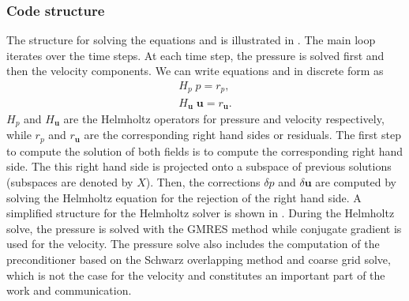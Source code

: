 \documentclass{sig-alternate}
\begin{document}
\subsubsection{Code structure}
\label{sec:code}

The structure for solving the equations  and  is illustrated in . The main loop iterates over the time steps. At each time step, the pressure is solved first and then the velocity components. We can write equations  and  in discrete form as 
\begin{align}
H_p \; p = r_p, \\
H_{\mathbf{u}} \; \mathbf{u} = r_{\mathbf{u}}.
\end{align}
$H_p$ and $H_{\mathbf{u}}$ are the Helmholtz operators for pressure and velocity respectively, while $r_p$ and $r_{\mathbf{u}}$ are the corresponding right hand sides or residuals. The first step to compute the solution of both fields is to compute the corresponding right hand side. The this right hand side is projected onto a subspace of previous solutions (subspaces are denoted by $X$). Then, the corrections $\delta p$ and $\delta \mathbf{u}$ are computed by solving the Helmholtz equation for the rejection of the right hand side. A simplified structure for the Helmholtz solver is shown in . During the Helmholtz solve, the pressure is solved with the GMRES method while conjugate gradient is used for the velocity. The pressure solve also includes the computation of the preconditioner based on the Schwarz overlapping method and coarse grid solve, which is not the case for the velocity and constitutes an important part of the work and communication.
\end{document}
